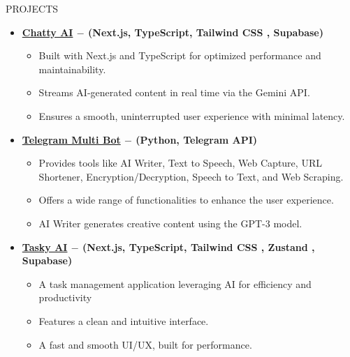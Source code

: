 \documentclass{resume} %
\begin{document}
\begin{rSection}{PROJECTS}
\vspace{0.6em}

\begin{itemize}
\item \textbf{\href{https://github.com/jackwaghan/Chatty-AI}{Chatty AI} \(-\) (Next.js, TypeScript, Tailwind CSS , Supabase)}  
    \begin{itemize}
        \item Built with Next.js and TypeScript for optimized performance and maintainability.  
        \item Streams AI-generated content in real time via the Gemini API.  
        \item Ensures a smooth, uninterrupted user experience with minimal latency.  
    \end{itemize}  

\item \textbf{\href{https://github.com/jackwaghan/Telegram-Multi-Bot}{Telegram Multi Bot} \(-\) (Python, Telegram API)}  
    \begin{itemize}
        \item Provides tools like AI Writer, Text to Speech, Web Capture, URL Shortener, Encryption/Decryption, Speech to Text, and Web Scraping.  
        \item Offers a wide range of functionalities to enhance the user experience.
        \item AI Writer generates creative content using the GPT-3 model.
    \end{itemize}  

\item \textbf{\href{https://github.com/jackwaghan/Tasky-AI}{Tasky AI} \(-\) (Next.js, TypeScript, Tailwind CSS , Zustand , Supabase)}
    \begin{itemize}
        \item A task management application leveraging AI for efficiency and productivity  
        \item Features a clean and intuitive interface. 
        \item A fast and smooth UI/UX, built for performance. 
    \end{itemize}  
\end{itemize}

\end{rSection}

\end{document}
